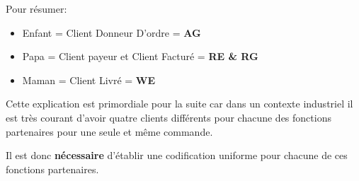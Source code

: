 Pour résumer:

\begin{itemize}\itemsep7pt
	\item Enfant = Client Donneur D'ordre = \textbf{AG}
	\item Papa = Client payeur et Client Facturé = \textbf{RE \& RG}
	\item Maman = Client Livré = \textbf{WE}
\end{itemize}
	
Cette explication est primordiale pour la suite car dans un contexte industriel il est très courant d'avoir quatre clients différents pour chacune des fonctions partenaires pour une seule et même commande.
	
Il est donc \textbf{nécessaire} d'établir une codification uniforme pour chacune de ces fonctions partenaires.

\clearpage

